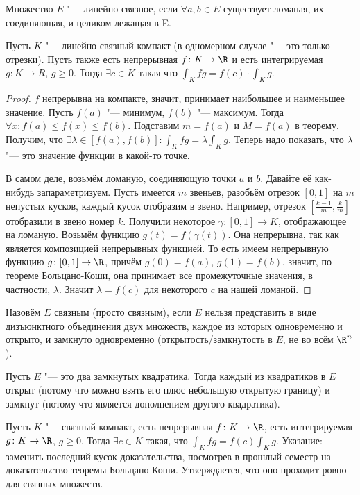 \begin{Def}
	Множество $E$ "--- линейно связное, если $\forall a, b \in E$
	существует ломаная, их соединяющая, и целиком лежащая в E.
\end{Def}
\begin{conseq}\label{23_lin_conn}
	Пусть $K$ "--- линейно связный компакт (в одномерном случае "--- это только отрезки).
	Пусть также есть непрерывная $f \colon K \to \R$ и есть интегрируемая $g \colon K \to R$, $g \ge 0$.
	Тогда $\exists c \in K$ такая что $\int_K fg = f(c) \cdot \int_K g$.
\end{conseq}
\begin{proof}
	$f$ непрерывна на компакте, значит, принимает наибольшее и наименьшее значение.
	Пусть $f(a)$ "--- минимум, $f(b)$ "--- максимум.
	Тогда $\forall x \colon f(a) \le f(x) \le f(b)$.
	Подставим $m=f(a)$ и $M=f(a)$ в теорему.
	Получим, что $\exists \lambda \in [f(a), f(b)] \colon \int_K fg = \lambda \int_K g$.
	Теперь надо показать, что $\lambda$ "--- это значение функции в какой-то точке.

	В самом деле, возьмём ломаную, соединяющую точки $a$ и $b$.
	Давайте её как-нибудь запараметризуем.
	Пусть имеется $m$ звеньев, разобьём отрезок $[0,1]$ на $m$ непустых кусков, каждый кусок отобразим в звено.
	Например, отрезок $[\frac{k-1}{m}, \frac{k}{m}]$ отобразили в звено номер $k$.
	Получили некоторое $\gamma \colon [0,1] \to K$, отображающее на ломаную.
	Возьмём функцию $g(t)=f(\gamma(t))$.
	Она непрерывна, так как является композицией непрерывных функцией.
	То есть имеем непрерывную функцию $g \colon [0,1] \to \R$, причём $g(0)=f(a)$, $g(1)=f(b)$,
	значит, по теореме Больцано-Коши, она принимает все промежуточные значения, в частности, $\lambda$.
	Значит $\lambda=f(c)$ для некоторого $c$ на нашей ломаной.
\end{proof}
\begin{Def}
	Назовём $E$ связным (просто связным), если $E$ нельзя представить в виде дизъюнктного объединения двух множеств,
	каждое из которых одновременно и открыто, и замкнуто одновременно (открытость/замкнутость в $E$, не во всём $\R^n$).
\end{Def}
\begin{exmp}
	Пусть $E$ "--- это два замкнутых квадратика.
	Тогда каждый из квадратиков в $E$ открыт (потому что можно взять его плюс небольшую открытую границу)
	и замкнут (потому что является дополнением другого квадратика).
\end{exmp}
\begin{Exercise}
	Пусть $K$ "--- связный компакт, есть непрерывная $f \colon K \to \R$,
	есть интегрируемая $g \colon K \to \R$, $g \ge 0$.
	Тогда $\exists c \in K$ такая, что $\int_K fg = f(c) \int_K g$.
	Указание: заменить последний кусок доказательства, посмотрев в прошлый семестр на доказательство теоремы Больцано-Коши.
	Утверждается, что оно проходит ровно для связных множеств.
\end{Exercise}

